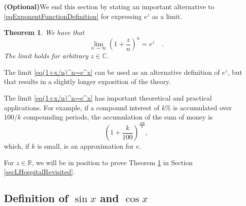 \documentclass[12pt]{book}
\newtheorem{theorem}{Theorem}[section]
\newcommand{\optionalMaterial}{\textbf{(Optional)}}
\begin{document}
\optionalMaterial We end this section by stating an important alternative to \ref{eqExponentFunctionDefinition} for expressing $e^z$ as a limit.
\begin{theorem}\label{th(1+x/n)^n=e^x}
We have that
\begin{equation}\label{eq(1+x/n)^n=e^x}
\lim_{n\to \infty} \left(1+\frac{z}n\right)^n= e^z\quad .
\end{equation}
The limit holds for arbitrary $z\in \mathbb C$.
\end{theorem}
The limit \eqref{eq(1+x/n)^n=e^x} can be used as an alternative definition of $e^{z}$, but that results in a slightly longer exposition of the theory.

The limit \eqref{eq(1+x/n)^n=e^x} has important theoretical and practical applications. For example, if a compound interest of $ k\%$ is accumulated over $100/k $ compounding periods, the accumulation of the sum of money is
\[
\left(1+\frac{k}{100}\right)^{\frac{100}{k}},
\]
which, if $k$ is small, is an approximation for $e$.

For $z\in \mathbb R$, we will be in position to prove Theorem \ref{th(1+x/n)^n=e^x} in Section \ref{secLHospitalRevisited}.
\subsection{Definition of $\sin x$ and $\cos x$}
 
\end{document}
